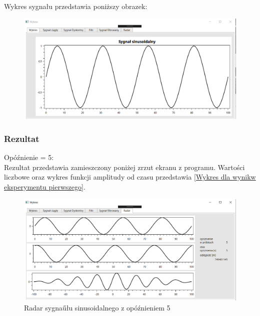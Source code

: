 \documentclass[12pt]{article}
\begin{document}
Wykres sygnału przedstawia poniższy obrazek:
\begin{figure}[h!]
 \centering
 \includegraphics[width=12.3cm]{sin1.PNG}
 \vspace{-0.3cm}
 \label{gw}
\end{figure}
\subsubsection{Rezultat}

Opóźnienie = 5:
\\Rezultat przedstawia zamieszczony poniżej zrzut ekranu z programu. Wartości liczbowe oraz wykres funkcji amplitudy od czasu przedstawia \ref{Wykres dla wynikw eksperymentu pierwszego}.
\begin{figure}[h!]
 \centering
 \includegraphics[width=12.3cm]{sin1R5.PNG}
 \vspace{-0.3cm}
 \caption{Radar sygnaűłu sinusoidalnego z opóźnieniem 5}
 \label{R5}
\end{figure}
\end{document}
